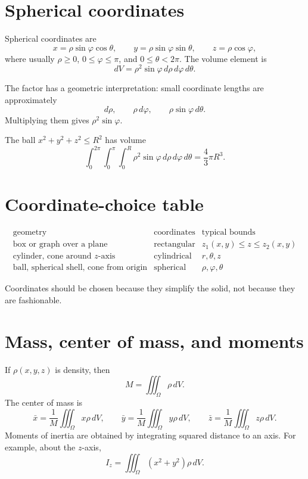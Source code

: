 \section{Spherical coordinates}

Spherical coordinates are
\[
  x=\rho\sin\varphi\cos\theta,\qquad
  y=\rho\sin\varphi\sin\theta,\qquad
  z=\rho\cos\varphi,
\]
where usually \(\rho\ge0\), \(0\le\varphi\le\pi\), and \(0\le\theta<2\pi\).  The volume element is
\[
  dV=\rho^2\sin\varphi\,d\rho\,d\varphi\,d\theta.
\]

The factor has a geometric interpretation: small coordinate lengths are approximately
\[
  d\rho,\qquad \rho\,d\varphi,\qquad \rho\sin\varphi\,d\theta.
\]
Multiplying them gives \(\rho^2\sin\varphi\).

\begin{example}
The ball \(x^2+y^2+z^2\le R^2\) has volume
\[
  \int_0^{2\pi}\int_0^{\pi}\int_0^R
  \rho^2\sin\varphi\,d\rho\,d\varphi\,d\theta
  =\frac{4}{3}\pi R^3.
\]
\end{example}

\section{Coordinate-choice table}

\[
\begin{array}{c|c|c}
\text{geometry} & \text{coordinates} & \text{typical bounds}\\
\hline
\text{box or graph over a plane} & \text{rectangular} & z_1(x,y)\le z\le z_2(x,y)\\
\text{cylinder, cone around }z\text{-axis} & \text{cylindrical} & r,\theta,z\\
\text{ball, spherical shell, cone from origin} & \text{spherical} & \rho,\varphi,\theta
\end{array}
\]

Coordinates should be chosen because they simplify the solid, not because they are fashionable.

\section{Mass, center of mass, and moments}

If \(\rho(x,y,z)\) is density, then
\[
  M=\iiint_{\Omega} \rho\,dV.
\]
The center of mass is
\[
  \bar x=\frac{1}{M}\iiint_{\Omega}x\rho\,dV,\qquad
  \bar y=\frac{1}{M}\iiint_{\Omega}y\rho\,dV,\qquad
  \bar z=\frac{1}{M}\iiint_{\Omega}z\rho\,dV.
\]
Moments of inertia are obtained by integrating squared distance to an axis.  For example, about the \(z\)-axis,
\[
  I_z=\iiint_{\Omega}(x^2+y^2)\rho\,dV.
\]

